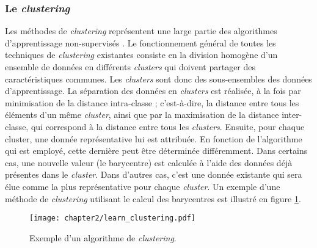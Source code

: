 \subsubsection{Le \textit{clustering}}

Les méthodes de \textit{clustering} représentent une large partie des algorithmes d'apprentissage non-supervisés \citep{Witten2016}. Le fonctionnement général de toutes les techniques de \textit{clustering} existantes consiste en la division homogène d'un ensemble de données en différents \textit{clusters} qui doivent partager des caractéristiques communes. Les \textit{clusters} sont donc des sous-ensembles des données d'apprentissage. La séparation des données en \textit{clusters} est réalisée, à la fois par minimisation de la distance intra-classe ; c'est-à-dire, la distance entre tous les éléments d'un même \textit{cluster}, ainsi que par la maximisation de la distance inter-classe, qui correspond à la distance entre tous les \textit{clusters}. Ensuite, pour chaque cluster, une donnée représentative lui est attribuée. En fonction de l'algorithme qui est employé, cette dernière peut être déterminée différemment. Dans certains cas, une nouvelle valeur (le barycentre) est calculée à l'aide des données déjà présentes dans le \textit{cluster}. Dans d'autres cas, c'est une donnée existante qui sera élue comme la plus représentative pour chaque \textit{cluster}. Un exemple d'une méthode de \textit{clustering} utilisant le calcul des barycentres est illustré en figure \ref{fig:learn_clustering}.

\begin{figure}[H]
	\centering
	\texttt{[image: chapter2/learn\_clustering.pdf]}
	\caption{Exemple d'un algorithme de \textit{clustering}.}
	\label{fig:learn_clustering}
\end{figure}

